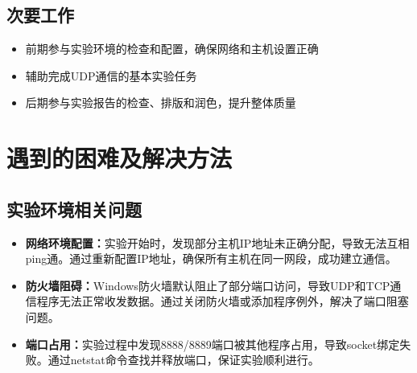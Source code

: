 \documentclass[a4paper]{article}
\begin{document}
\subsection{次要工作}
\begin{itemize}
    \item 前期参与实验环境的检查和配置，确保网络和主机设置正确
    \item 辅助完成UDP通信的基本实验任务
    \item 后期参与实验报告的检查、排版和润色，提升整体质量
\end{itemize}

\section{遇到的困难及解决方法}

\subsection{实验环境相关问题}
\begin{itemize}
    \item \textbf{网络环境配置：}实验开始时，发现部分主机IP地址未正确分配，导致无法互相ping通。通过重新配置IP地址，确保所有主机在同一网段，成功建立通信。
    \item \textbf{防火墙阻碍：}Windows防火墙默认阻止了部分端口访问，导致UDP和TCP通信程序无法正常收发数据。通过关闭防火墙或添加程序例外，解决了端口阻塞问题。
    \item \textbf{端口占用：}实验过程中发现8888/8889端口被其他程序占用，导致socket绑定失败。通过netstat命令查找并释放端口，保证实验顺利进行。
\end{itemize}
\end{document}
